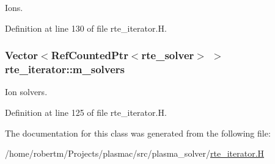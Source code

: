 Ions. 



Definition at line 130 of file rte\+\_\+iterator.\+H.

\subsubsection[{\texorpdfstring{m\+\_\+solvers}{m_solvers}}]{\setlength{\rightskip}{0pt plus 5cm}Vector$<$Ref\+Counted\+Ptr$<${\bf rte\+\_\+solver}$>$ $>$ rte\+\_\+iterator\+::m\+\_\+solvers\hspace{0.3cm}{\ttfamily [protected]}}\hypertarget{classrte__iterator_a451dec739a34d23dd700a3153bbbf3d4}{}\label{classrte__iterator_a451dec739a34d23dd700a3153bbbf3d4}


Ion solvers. 



Definition at line 125 of file rte\+\_\+iterator.\+H.



The documentation for this class was generated from the following file\+:\begin{DoxyCompactItemize}
\item 
/home/robertm/\+Projects/plasmac/src/plasma\+\_\+solver/\hyperlink{rte__iterator_8H}{rte\+\_\+iterator.\+H}\end{DoxyCompactItemize}
